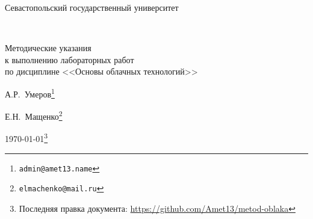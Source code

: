
\begin{center}
\Large{Севастопольский государственный университет}
\end{center}

{~}\bigskip %

\begin{center}
\Huge{Методические указания \\
к выполнению лабораторных работ \\
по дисциплине <<Основы облачных технологий>>} %

\vspace{1em}
\Large{А.Р.~Умеров}\footnote{\texttt{admin@amet13.name}} %

\Large{Е.Н.~Мащенко}\footnote{\texttt{elmachenko@mail.ru}} %

\Large{\today}\footnote{Последняя правка документа: \url{https://github.com/Amet13/metod-oblaka}} %
\end{center}

\clearpage %
